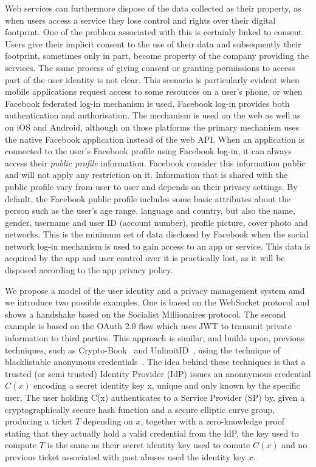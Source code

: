 Web services can furthermore dispose of the data collected as their property, as when users access a service they lose control and rights over their digital footprint. One of the problem associated with this is certainly linked to consent. Users give their implicit consent to the use of their data and subsequently their footprint, sometimes only in part, become property of the company providing the services. The same process of giving consent or granting permissions to access part of the user identity is not clear. This scenario is particularly evident when mobile applications request access to some resources on a user's phone, or when Facebook federated log-in mechanism is used. Facebook log-in provides both authentication and authorisation. The mechanism is used on the web as well as on iOS and Android, although on those platforms the primary mechanism uses the native Facebook application instead of the web API. When an application is connected to the user's Facebook profile using Facebook log-in, it can always access their \emph{public profile} information. Facebook consider this information public and will not apply any restriction on it. Information that is shared with the public profile vary from user to user and depends on their privacy settings. By default, the Facebook public profile includes some basic attributes about the person such as the user's age range, language and country, but also the name, gender, username and user ID (account number), profile picture, cover photo and networks. This is the minimum set of data disclosed by Facebook when the social network log-in mechanism is used to gain access to an app or service. This data is acquired by the app and user control over it is practically lost, as it will be disposed according to the app privacy policy.

We propose a model of the user identity and a privacy management system amd we introduce two possible examples. One is based on the WebSocket protocol and shows a handshake based on the Socialist Millionaires protocol. The second example is based on the OAuth 2.0 flow which uses JWT to transmit private information to third parties. This approach is similar, and builds upon, previous techniques, such as Crypto-Book~\cite{maheswaran2013crypto} and UnlimitID~\cite{isaakidis2016unlimitid}, using the technique of blacklistable anonymous credentials~\cite{tsang2007blacklistable}. The idea behind these techniques is that a trusted (or semi trusted) Identity Provider (IdP) issues an anonnymous credential $C(x)$ encoding a secret identity key x, unique and only known by the specific user. The user holding C(x) authenticates to a Service Provider (SP) by, given a cryptographically secure hash function and a secure elliptic curve group, producing a ticket $T$ depending on $x$, together with a zero-knowledge proof stating that they actually hold a valid credential from the IdP, the key used to compute $T$ is the same as their secret identity key used to comute $C(x)$ and no previous ticket associated with past abuses used the identity key $x$.

